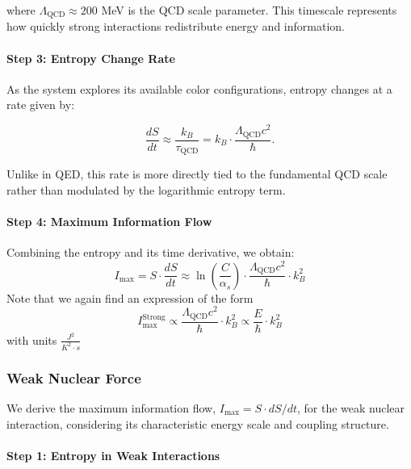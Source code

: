 \documentclass[12pt]{article}
\begin{document}
where $\Lambda_{\text{QCD}} \approx 200$ MeV is the QCD scale parameter. This timescale represents how quickly strong interactions redistribute energy and information.

\paragraph{Step 3: Entropy Change Rate}

As the system explores its available color configurations, entropy changes at a rate given by:

\begin{equation}
    \frac{dS}{dt} \approx \frac{k_B}{\tau_{\text{QCD}}} = k_B \cdot \frac{\Lambda_{\text{QCD}}c^2}{\hbar}.
\end{equation}

Unlike in QED, this rate is more directly tied to the fundamental QCD scale rather than modulated by the logarithmic entropy term.

\paragraph{Step 4: Maximum Information Flow}

Combining the entropy and its time derivative, we obtain:
\begin{equation}
    I_{\max} = S \cdot \frac{dS}{dt} \approx \ln\left(\frac{C}{\alpha_s}\right) \cdot \frac{\Lambda_{\text{QCD}}c^2}{\hbar} \cdot k_B^2
\end{equation}
Note that we again find an expression of the form
\begin{equation}
    I_{\max}^{\text{Strong}} \propto \frac{\Lambda_{\text{QCD}}c^2}{\hbar} \cdot k_B^2 \propto \frac{E}{\hbar} \cdot k_B^2 
\end{equation}
with units $\frac{J^2}{K^2 \cdot s}$

\subsubsection{Weak Nuclear Force}

We derive the maximum information flow, $I_{\max} = S \cdot dS/dt$, for the weak nuclear interaction, considering its characteristic energy scale and coupling structure.

\paragraph{Step 1: Entropy in Weak Interactions}
\end{document}
